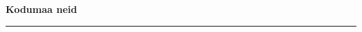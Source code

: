 \documentclass[10pt]{book}
\begin{document}
{
  \samepage
  \raggedbottom
  \raggedright
  \sloppy


  \vspace{0.2in}

  \noindent\begin{minipage}{.1\textwidth}
    \hfill\vspace{0.1in}
  \end{minipage}%
  \noindent\begin{minipage}{.8\textwidth}
    \centering
    \bfseries
    \large Kodumaa neid
  \end{minipage}%
  \noindent\begin{minipage}{.1\textwidth}
      \hfill\vspace{0.1in}
  \end{minipage}

  \nopagebreak[4]
  \vspace{0.1in}
  \nopagebreak[4]
  \hrule height 0.05ex
  \nopagebreak[4]
  \vspace{-0.05in}




}
\end{document}

